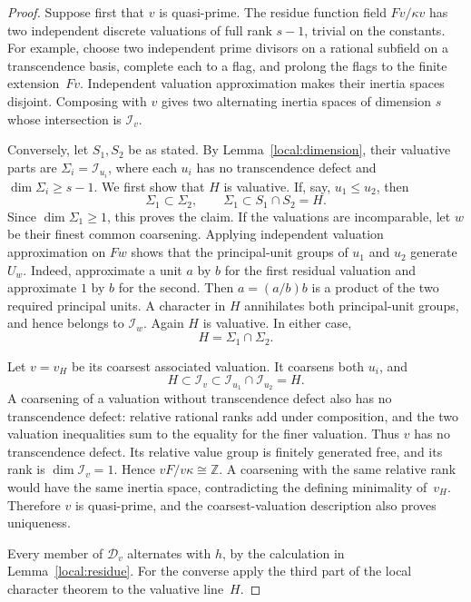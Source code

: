 \begin{proof}
Suppose first that $v$ is quasi-prime.  The residue function field
$Fv/\kappa v$ has two independent discrete valuations of full rank
$s-1$, trivial on the constants.  For example, choose two independent
prime divisors on a rational subfield on a transcendence basis,
complete each to a flag, and prolong the flags to the finite
extension~$Fv$.  Independent valuation approximation
\cite[Theorem~1.2]{ADF2020} makes their inertia spaces disjoint.
Composing with $v$ gives two alternating inertia spaces of dimension
$s$ whose intersection is $\mathcal I_v$.

Conversely, let $S_1,S_2$ be as stated.  By
Lemma~\ref{local:dimension}, their valuative parts are
$\Sigma_i=\mathcal I_{u_i}$, where each $u_i$ has no transcendence
defect and $\dim\Sigma_i\geq s-1$.
We first show that $H$ is valuative.  If, say, $u_1\leq u_2$, then
\[
 \Sigma_1\subset\Sigma_2,
 \qquad \Sigma_1\subset S_1\cap S_2=H.
\]
Since $\dim\Sigma_1\geq1$, this proves the claim.
If the valuations are incomparable, let $w$ be their finest common
coarsening.  Applying independent valuation approximation on $Fw$
shows that the principal-unit groups of $u_1$ and $u_2$ generate
$U_w$.  Indeed, approximate a unit $a$ by $b$ for the first residual
valuation and approximate $1$ by $b$ for the second.  Then
$a=(a/b)b$ is a product of the two required principal units.
A character in $H$ annihilates both principal-unit groups,
and hence belongs to $\mathcal I_w$.  Again $H$ is valuative.
In either case,
\[
 H=\Sigma_1\cap\Sigma_2.
\]

Let $v=v_H$ be its coarsest associated valuation.  It coarsens both
$u_i$, and
\[
 H\subset\mathcal I_v
 \subset\mathcal I_{u_1}\cap\mathcal I_{u_2}=H.
\]
A coarsening of a valuation without transcendence defect also has
no transcendence defect: relative rational ranks add under
composition, and the two valuation inequalities sum to the equality
for the finer valuation.  Thus $v$ has no transcendence defect.
Its relative value group is finitely generated free, and its rank
is $\dim\mathcal I_v=1$.  Hence $vF/v\kappa\cong\mathbb Z$.
A coarsening with the same relative rank would have the same inertia
space, contradicting the defining minimality of~$v_H$.
Therefore $v$ is quasi-prime, and the coarsest-valuation description
also proves uniqueness.

Every member of $\mathcal D_v$ alternates with $h$, by the calculation
in Lemma~\ref{local:residue}.  For the converse apply the third part
of the local character theorem to the valuative line~$H$.
\end{proof}

